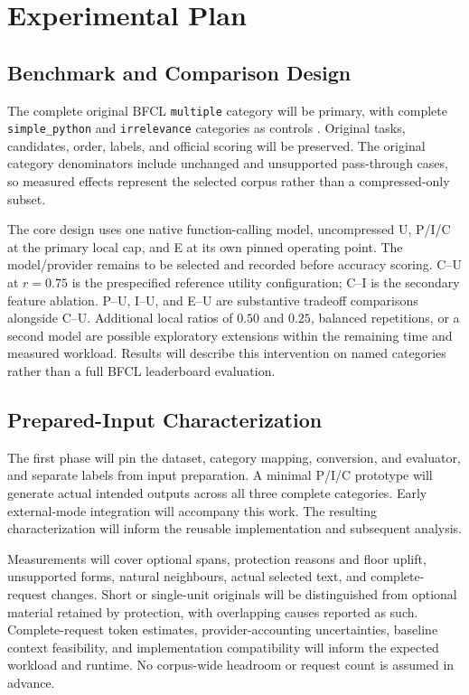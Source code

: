 \documentclass[conference]{IEEEtran}
\begin{document}
\section{Experimental Plan}
\subsection{Benchmark and Comparison Design}
The complete original BFCL \texttt{multiple} category will be primary, with complete \texttt{simple\_python} and \texttt{irrelevance} categories as controls \cite{bfclrepo,bfclmapping}. Original tasks, candidates, order, labels, and official scoring will be preserved. The original category denominators include unchanged and unsupported pass-through cases, so measured effects represent the selected corpus rather than a compressed-only subset.

The core design uses one native function-calling model, uncompressed U, P/I/C at the primary local cap, and E at its own pinned operating point. The model/provider remains to be selected and recorded before accuracy scoring. C--U at $r=0.75$ is the prespecified reference utility configuration; C--I is the secondary feature ablation. P--U, I--U, and E--U are substantive tradeoff comparisons alongside C--U. Additional local ratios of $0.50$ and $0.25$, balanced repetitions, or a second model are possible exploratory extensions within the remaining time and measured workload. Results will describe this intervention on named categories rather than a full BFCL leaderboard evaluation.

\subsection{Prepared-Input Characterization}
The first phase will pin the dataset, category mapping, conversion, and evaluator, and separate labels from input preparation. A minimal P/I/C prototype will generate actual intended outputs across all three complete categories. Early external-mode integration will accompany this work. The resulting characterization will inform the reusable implementation and subsequent analysis.

Measurements will cover optional spans, protection reasons and floor uplift, unsupported forms, natural neighbours, actual selected text, and complete-request changes. Short or single-unit originals will be distinguished from optional material retained by protection, with overlapping causes reported as such. Complete-request token estimates, provider-accounting uncertainties, baseline context feasibility, and implementation compatibility will inform the expected workload and runtime. No corpus-wide headroom or request count is assumed in advance.
\end{document}
